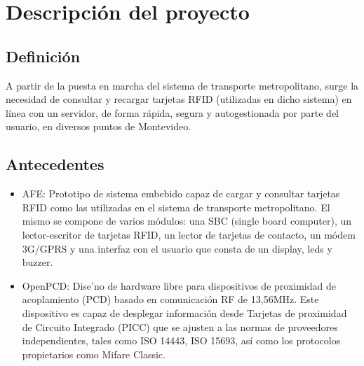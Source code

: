 \chapter{Descripci\'on del proyecto}

\section{Definici\'on}

A partir de la puesta en marcha del sistema de transporte metropolitano, surge la necesidad de consultar y recargar tarjetas RFID (utilizadas en dicho sistema) en l\'inea con un servidor, de forma r\'apida, segura y autogestionada por parte del usuario, en diversos puntos de Montevideo.

\section{Antecedentes}

\begin{itemize}

\item AFE: Prototipo de sistema embebido capaz de cargar y consultar tarjetas RFID como las utilizadas en el sistema de transporte metropolitano. El mismo se compone de varios m\'odulos: una SBC (single board computer), un lector-escritor de tarjetas RFID, un lector de tarjetas de contacto, un m\'odem 3G/GPRS y una interfaz con el usuario que consta de un display, leds y buzzer.

\item OpenPCD: Dise'no de hardware libre para dispositivos de proximidad de acoplamiento (PCD) basado en comunicaci\'on RF de 13,56MHz. Este dispositivo es capaz de desplegar informaci\'on desde Tarjetas de proximidad de Circuito Integrado (PICC) que se ajusten a las normas de proveedores independientes, tales como ISO 14443, ISO 15693, as\'i como los protocolos propietarios como Mifare Classic.

\end{itemize}